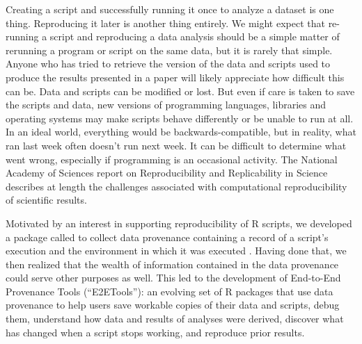Creating a script and successfully running it once to analyze a dataset is one thing. Reproducing it later is another thing entirely. We might expect that re-running a script and reproducing a data analysis should be a simple matter of rerunning a program or script on the same data, but it is rarely that simple. Anyone who has tried to retrieve the version of the data and scripts used to produce the results presented in a paper will likely appreciate how difficult this can be. Data and scripts can be modified or lost.  But even if care is taken to save the scripts and data, new versions of programming languages, libraries and operating systems may make scripts behave differently or be unable to run at all. In an ideal world, everything would be backwards-compatible, but in reality, what ran last week often doesn't run next week. It can be difficult to determine what went wrong, especially if programming is an occasional activity.  The National Academy of Sciences report on Reproducibility and Replicability in Science \citep{NAS:2019aa} describes at length the challenges associated with computational reproducibility of scientific results.


Motivated by an interest in supporting reproducibility of R scripts, we developed a package called  to collect data provenance containing a record of a script's execution and the environment in which it was executed \citep{Lerner:Informatics}.  Having done that, we then realized that the wealth of information contained in the data provenance could serve other purposes as well.
This led to the development of End-to-End Provenance Tools (``E2ETools''): an evolving set of R packages that use data provenance to help users save workable copies of their data and scripts, debug them, understand how data and results of analyses were derived, discover what has changed when a script stops working, and reproduce prior results.



